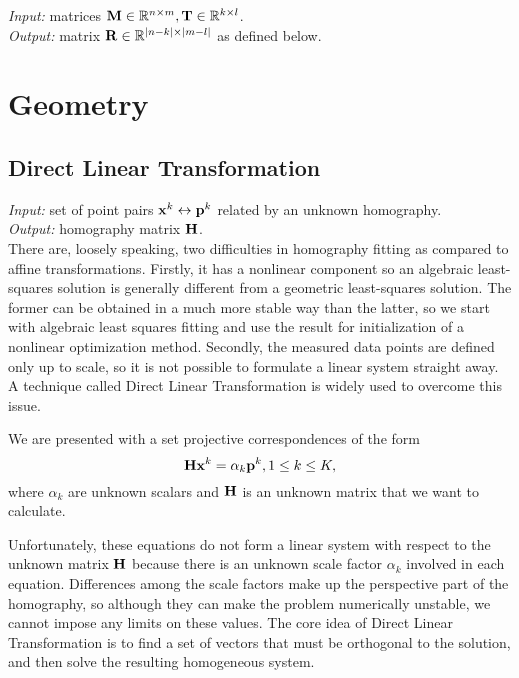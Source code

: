 \textit{Input:} matrices $\mathbf{M} \in \mathbb{R}^{n \times m}, \mathbf{T} \in \mathbb{R}^{k \times l}$.\\
\textit{Output:} matrix $\mathbf{R} \in \mathbb{R}^{|n-k| \times |m - l|}$ as defined below.\\


\section{Geometry}

\subsection{Direct Linear Transformation}

\textit{Input:} set of point pairs $\mathbf{x}^k \leftrightarrow \mathbf{p}^k$ related by an unknown homography.\\
\textit{Output:} homography matrix $\mathbf{H}$.\\

There are, loosely speaking, two difficulties in homography fitting as compared to affine transformations.
Firstly, it has a nonlinear component so an algebraic least-squares solution is generally different from a geometric least-squares solution.
The former can be obtained in a much more stable way than the latter, so we start with algebraic least squares fitting and use the result for initialization of a nonlinear optimization method.
Secondly, the measured data points are defined only up to scale, so it is not possible to formulate a linear system straight away.
A technique called Direct Linear Transformation is widely used to overcome this issue.

We are presented with a set projective correspondences of the form
$$\mathbf{H} \mathbf{x}^k = \alpha_k \mathbf{p}^k, 1 \leq k \leq K,$$
where $\alpha_k$ are unknown scalars and $\mathbf{H}$ is an unknown matrix that we want to calculate.

Unfortunately, these equations do not form a linear system with respect to the unknown matrix $\mathbf{H}$ because there is an unknown scale factor $\alpha_k$ involved in each equation.
Differences among the scale factors make up the perspective part of the homography, so although they can make the problem numerically unstable, we cannot impose any limits on these values.
The core idea of Direct Linear Transformation is to find a set of vectors that must be orthogonal to the solution, and then solve the resulting homogeneous system.

